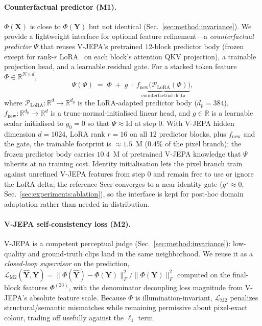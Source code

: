 \paragraph{Counterfactual predictor (M1).} $\Phi(\mathbf{X})$ is close to $\Phi(\mathbf{Y})$ but not identical (Sec.~\ref{sec:method:invariance}). We provide a lightweight interface for optional feature refinement---a \emph{counterfactual predictor} $\Psi$ that reuses V-JEPA's pretrained $12$-block predictor body (frozen except for rank-$r$ LoRA~\citep{lora} on each block's attention QKV projection), a trainable projection head, and a learnable residual gate. For a stacked token feature $\Phi\in\mathbb{R}^{N\times d}$,
\begin{equation}\label{eq:m1}
\Psi(\Phi) \;=\; \Phi \;+\; g\;\cdot\;\underbrace{f_{\text{new}}\bigl(\mathcal{P}_{\text{LoRA}}(\Phi)\bigr)}_{\text{counterfactual delta}},
\end{equation}
where $\mathcal{P}_{\text{LoRA}}\!:\!\mathbb{R}^{d}\!\to\!\mathbb{R}^{d_p}$ is the LoRA-adapted predictor body ($d_p{=}384$), $f_{\text{new}}\!:\!\mathbb{R}^{d_p}\!\to\!\mathbb{R}^{d}$ is a trunc-normal-initialised linear head, and $g\!\in\!\mathbb{R}$ is a learnable scalar initialised to $g_{0}{=}0$ so that $\Psi\!\approx\!\mathrm{Id}$ at step $0$. With V-JEPA hidden dimension $d{=}1024$, LoRA rank $r{=}16$ on all $12$ predictor blocks, plus $f_{\text{new}}$ and the gate, the trainable footprint is $\approx\!1.5$~M ($0.4\%$ of the pixel branch); the frozen predictor body carries $10.4$~M of pretrained V-JEPA knowledge that $\Psi$ inherits at no training cost. Identity initialisation lets the pixel branch train against unrefined V-JEPA features from step $0$ and remain free to use or ignore the LoRA delta; the reference Seer converges to a near-identity gate ($g^{\star}\!\approx\!0$, Sec.~\ref{sec:experiments:ablation}), so the interface is kept for post-hoc domain adaptation rather than needed in-distribution.

\paragraph{V-JEPA self-consistency loss (M2).} V-JEPA is a competent perceptual judge (Sec.~\ref{sec:method:invariance}): low-quality and ground-truth clips land in the same neighborhood. We reuse it as a \emph{closed-loop supervisor} on the prediction, $\mathcal{L}_{\text{M2}}(\hat{\mathbf{Y}},\mathbf{Y}) = \|\Phi(\hat{\mathbf{Y}}) - \Phi(\mathbf{Y})\|_{F}^{2} / \|\Phi(\mathbf{Y})\|_{F}^{2}$ computed on the final-block features $\Phi^{(23)}$, with the denominator decoupling loss magnitude from V-JEPA's absolute feature scale. Because $\Phi$ is illumination-invariant, $\mathcal{L}_{\text{M2}}$ penalizes structural/semantic mismatches while remaining permissive about pixel-exact colour, trading off usefully against the $\ell_{1}$ term.

